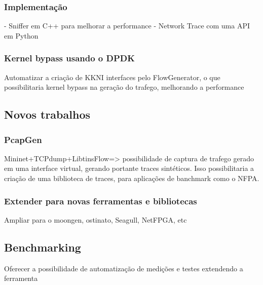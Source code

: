 \subsubsection{Implementação}

- Sniffer em C++ para melhorar a performance
- Network Trace com uma API em Python


\subsubsection{Kernel bypass usando o DPDK}

Automatizar a criação de KKNI interfaces pelo FlowGenerator, o que possibilitaria kernel bypass na geração do trafego, melhorando a performance

\subsection{Novos trabalhos}

\subsubsection{PcapGen}

Mininet+TCPdump+LibtinsFlow=> possibilidade de captura de trafego gerado em uma interface virtual, gerando portante traces sintéticos.
Isso possibilitaria a criação de uma biblioteca de traces, para aplicações de banchmark como o NFPA.

\subsubsection{Extender para novas ferramentas e bibliotecas}

Ampliar para o moongen, ostinato, Seagull, NetFPGA, etc

\subsection{Benchmarking}

Oferecer a possibilidade de automatização de medições e testes extendendo a ferramenta





